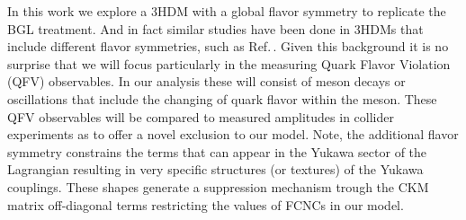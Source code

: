 In this work we explore a 3HDM with a global flavor symmetry to replicate the BGL treatment. And in fact similar studies have been done in 3HDMs that include different flavor symmetries, such as Ref.\,\cite{Camargo_Molina_2018}. Given this background it is no surprise that we will focus particularly in the measuring Quark Flavor Violation (QFV) observables. In our analysis these will consist of meson decays or oscillations that include the changing of quark flavor within the meson. These QFV observables will be compared to measured amplitudes in collider experiments as to offer a novel exclusion to our model. Note, the additional flavor symmetry constrains the terms that can appear in the Yukawa sector of the Lagrangian resulting in very specific structures (or textures) of the Yukawa couplings. These shapes generate a suppression mechanism trough the CKM matrix off-diagonal terms restricting the values of FCNCs in our model.%

